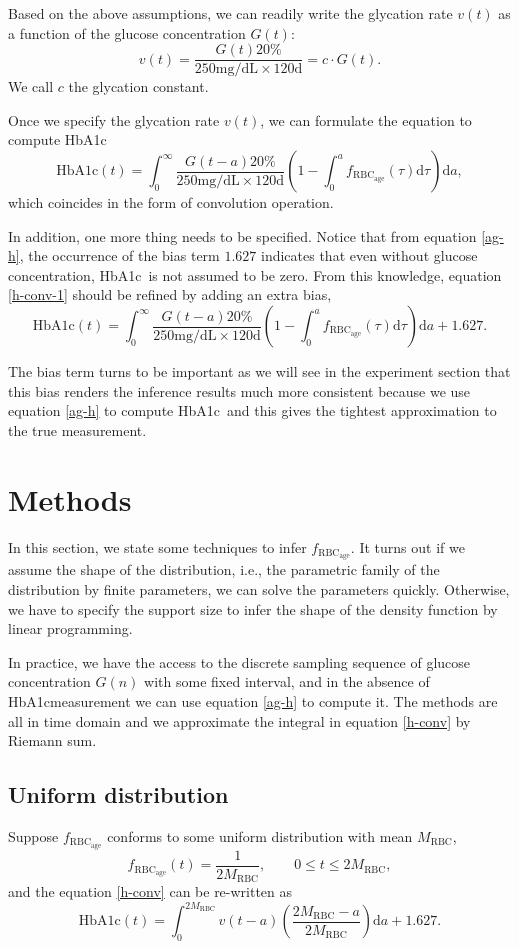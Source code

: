 \documentclass{article}
\newcommand{\hba}{\textrm{HbA1c}}
\newcommand{\f}{f_{\mathrm{RBC}_{\mathrm{age}}}}
\newcommand{\dd}{\mathrm{d }}
\newcommand{\mean}{M_\mathrm{RBC}}
\begin{document}
Based on the above assumptions, we can readily write the glycation rate $v(t)$ as a function of the glucose concentration $G(t)$:
\[v(t) = \frac{G(t)20\%}{250\mathrm{mg/dL}\times120\dd}=c\cdot G(t).\] 
We call $c$ the glycation constant.

Once we specify the glycation rate $v(t)$, we can formulate the equation to compute \hba
\begin{equation}
\hba(t) = \int_{0}^{\infty}\frac{G(t-a)20\%}{250\mathrm{mg/dL}\times120\mathrm{d}}\left(1-\int_{0}^{a}\f(\tau)\dd\tau\right) \dd a,
\label{h-conv-1}
\end{equation}
which coincides in the form of convolution operation.

In addition, one more thing needs to be specified. Notice that from  equation \ref{ag-h}, the occurrence of the bias term $1.627$ indicates that even without glucose concentration, \hba\ is not assumed to be zero. From this knowledge, equation \ref{h-conv-1} should be refined by adding an extra bias,
\begin{equation}
\hba(t) = \int_{0}^{\infty}\frac{G(t-a)20\%}{250\mathrm{mg/dL}\times120\mathrm{d}}\left(1-\int_{0}^{a}\f(\tau)\dd\tau\right) \dd a + 1.627.
\label{h-conv}
\end{equation}

The bias term turns to be important as we will see in the experiment section that this bias renders the inference results much more consistent because we use equation \ref{ag-h} to compute \hba\ and this gives the tightest approximation to the true measurement.

\section{Methods}
In this section, we state some techniques to infer $\f$. It turns out if we assume the shape of the distribution, i.e., the parametric family of the distribution by finite parameters, we can solve the parameters quickly. Otherwise, we have to specify the support size  to infer the shape of the density function by linear programming.

In practice, we have the access to the discrete sampling sequence of glucose concentration $G(n)$ with some fixed interval, and in the absence of \hba measurement we can use equation \ref{ag-h} to compute it. The methods are all in time domain and we approximate the integral in equation \ref{h-conv} by Riemann sum. 

\subsection{Uniform distribution}
Suppose $\f$ conforms to some uniform distribution with mean $\mean$,
\[\f(t) = \frac{1}{2\mean},\quad\quad 0\leq t\leq 2\mean,\]
and the equation \ref{h-conv} can be re-written as 
\[\hba(t) = \int_{0}^{2\mean}v(t-a)\left(\frac{2\mean - a}{2\mean}\right) \dd a + 1.627.\]
\end{document}
